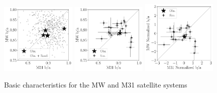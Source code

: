 \documentclass[a4paper,fleqn,usenatbib]{mnras}
\begin{document}
\begin{figure}
\centering
\includegraphics[width=0.32\textwidth]{scatter_random_ranked_ba_ratio.pdf}
\includegraphics[width=0.32\textwidth]{scatter_ranked_ba_ratio.pdf}
\includegraphics[width=0.32\textwidth]{scatter_norm_ba_ratio.pdf}
\caption{Basic characteristics for the MW and M31 satellite systems
\label{fig:lg_scatter}}
\end{figure}
\end{document}
